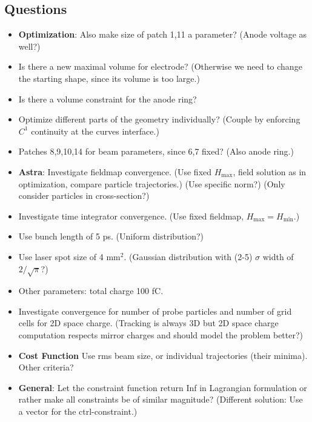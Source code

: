 \subsection{Questions}
\begin{itemize}

   \item \textbf{Optimization}: Also make size of patch 1,11 a parameter? (Anode voltage as well?)
   \item Is there a new maximal volume for electrode? (Otherwise we need to change the starting shape, since its volume is too large.)
   \item Is there a volume constraint for the anode ring?
   \item Optimize different parts of the geometry individually? (Couple by enforcing $C^1$ continuity at the curves interface.)
   \item Patches 8,9,10,14 for beam parameters, since 6,7 fixed? (Also anode ring.)\\

   \item \textbf{Astra}: Investigate fieldmap convergence. (Use fixed $H_\mathrm{max}$, field solution as in optimization, compare particle trajectories.) (Use specific norm?) (Only consider particles in cross-section?)
   \item Investigate time integrator convergence. (Use fixed fieldmap, $H_\mathrm{max}=H_\mathrm{min}$.)

   \item Use bunch length of 5 ps. (Uniform distribution?)
   \item Use laser spot size of 4 $\mathrm{mm}^2$. (Gaussian distribution with (2-5) $\sigma$ width of $2/\sqrt{\pi}$?)
   \item Other parameters: total charge 100 fC.

   \item Investigate convergence for number of probe particles and number of grid cells for 2D space charge. (Tracking is always 3D but 2D space charge computation respects mirror charges and should model the problem better?)

   \item \textbf{Cost Function} Use rms beam size, or individual trajectories (their minima). Other criteria?

   \item \textbf{General}: Let the constraint function return Inf in Lagrangian formulation or rather make all constraints be of similar magnitude? (Different solution: Use a vector for the ctrl-constraint.)\\
\end{itemize}

